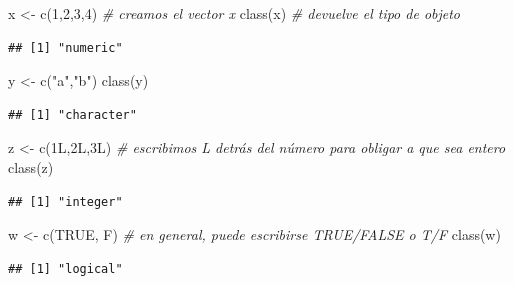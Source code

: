 \documentclass[
]{book}
\newenvironment{Shaded}{\begin{snugshade}}{\end{snugshade}}
\newcommand{\CommentTok}[1]{\textcolor[rgb]{0.56,0.35,0.01}{\textit{#1}}}
\newcommand{\ConstantTok}[1]{\textcolor[rgb]{0.00,0.00,0.00}{#1}}
\newcommand{\DecValTok}[1]{\textcolor[rgb]{0.00,0.00,0.81}{#1}}
\newcommand{\FunctionTok}[1]{\textcolor[rgb]{0.00,0.00,0.00}{#1}}
\newcommand{\NormalTok}[1]{#1}
\newcommand{\OtherTok}[1]{\textcolor[rgb]{0.56,0.35,0.01}{#1}}
\newcommand{\StringTok}[1]{\textcolor[rgb]{0.31,0.60,0.02}{#1}}
\begin{document}
\begin{Shaded}
\begin{Highlighting}[]
\NormalTok{x }\OtherTok{\textless{}{-}} \FunctionTok{c}\NormalTok{(}\DecValTok{1}\NormalTok{,}\DecValTok{2}\NormalTok{,}\DecValTok{3}\NormalTok{,}\DecValTok{4}\NormalTok{)    }\CommentTok{\# creamos el vector x}
\FunctionTok{class}\NormalTok{(x)           }\CommentTok{\# devuelve el tipo de objeto}
\end{Highlighting}
\end{Shaded}

\begin{verbatim}
## [1] "numeric"
\end{verbatim}

\begin{Shaded}
\begin{Highlighting}[]
\NormalTok{y }\OtherTok{\textless{}{-}} \FunctionTok{c}\NormalTok{(}\StringTok{"a"}\NormalTok{,}\StringTok{"b"}\NormalTok{)}
\FunctionTok{class}\NormalTok{(y)}
\end{Highlighting}
\end{Shaded}

\begin{verbatim}
## [1] "character"
\end{verbatim}

\begin{Shaded}
\begin{Highlighting}[]
\NormalTok{z }\OtherTok{\textless{}{-}} \FunctionTok{c}\NormalTok{(1L,2L,3L)   }\CommentTok{\# escribimos L detrás del número para obligar a que sea entero}
\FunctionTok{class}\NormalTok{(z)}
\end{Highlighting}
\end{Shaded}

\begin{verbatim}
## [1] "integer"
\end{verbatim}

\begin{Shaded}
\begin{Highlighting}[]
\NormalTok{w }\OtherTok{\textless{}{-}} \FunctionTok{c}\NormalTok{(}\ConstantTok{TRUE}\NormalTok{, F)    }\CommentTok{\# en general, puede escribirse TRUE/FALSE o T/F}
\FunctionTok{class}\NormalTok{(w)}
\end{Highlighting}
\end{Shaded}

\begin{verbatim}
## [1] "logical"
\end{verbatim}
\end{document}
